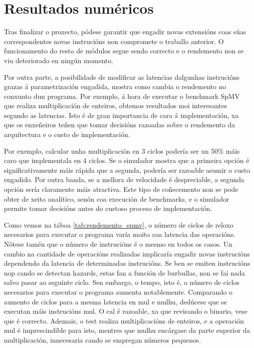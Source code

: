 \section{Resultados numéricos}\label{chap:resultados}
Tras finalizar o proxecto, pódese garantir que engadir novas extensións coas súas correspondentes novas instrucións non compromete o traballo anterior. O funcionamento do resto de módulos segue sendo correcto e o rendemento non se viu deteriorado en ningún momento.

Por outra parte, a posibilidade de modificar as latencias dalgunhas instrucións grazas á parametrización engadida, mostra como cambia o rendemento no conxunto dun programa. Por exemplo, á hora de executar o benchmark SpMV que realiza multiplicación de enteiros, obtemos resultados moi interesantes segundo as latencias. Isto é de gran importancia de cara á implementación, xa que os enxeñeiros teñen que tomar decisións razoadas sobre o rendemento da arquitectura e o custo de implementación. 

Por exemplo, calcular unha multiplicación en 3 ciclos podería ser un 50\% máis caro que implementala en 4 ciclos. Se o simulador mostra que a primeira opción é significativamente máis rápida que a segunda, podería ser razoable asumir o custo engadido. Por outra banda, se a mellora de velocidade é despreciable, a segunda opción sería claramente máis atractiva. Este tipo de coñecemento non se pode obter de xeito analítico, senón coa execución de benchmarks, e o simulador permite tomar decisións antes do custoso proceso de implementación. 

Como vemos na táboa \ref{tab:rendemento_spmv}, o número de ciclos de reloxo necesarios para executar o programa varía moito coa latencia das operacións. Nótese tamén que o número de instrucións é o mesmo en todos os casos. Un cambio na cantidade de operacións realizadas implicaría engadir novas instrucións dependendo da latencia de determinadas instrucións. Se ben se emiten instrucións \acrshort{nop} cando se detectan hazards, estas fan a función de burbullas, non se fai nada salvo pasar ao seguinte ciclo. Sen embargo, o tempo, isto é, o número de ciclos necesarios para executar o programa aumenta notablemente. Comparando o aumento de ciclos para a mesma latencia en mul e mulhu, dedúcese que se executan máis instrucións mul. O cal é razoable, xa que revisando o binario, vese que é correcto. Ademais, o test realiza multiplicacións de enteiros, e a operación mul é imprescindible para isto, mentres que mulhu encárgase da parte superior da multiplicación, innecesaria cando se empregan números pequenos.

